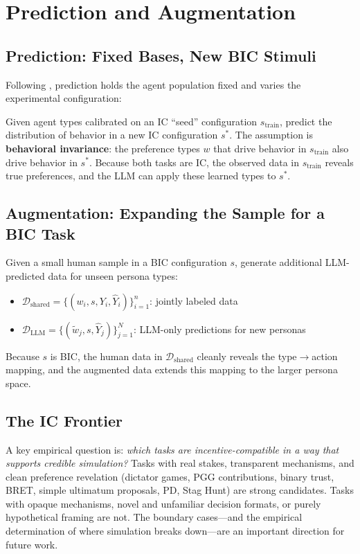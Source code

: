 \documentclass[12pt]{article}
\begin{document}
\section{Prediction and Augmentation}
\label{sec:pred_aug}

\subsection{Prediction: Fixed Bases, New BIC Stimuli}

Following \citet{manning2026general}, prediction holds the agent population fixed and varies the experimental configuration:

Given agent types calibrated on an IC ``seed'' configuration $s_{\text{train}}$, predict the distribution of behavior in a new IC configuration $s^*$. The assumption is \textbf{behavioral invariance}: the preference types $w$ that drive behavior in $s_{\text{train}}$ also drive behavior in $s^*$. Because both tasks are IC, the observed data in $s_{\text{train}}$ reveals true preferences, and the LLM can apply these learned types to $s^*$.

\subsection{Augmentation: Expanding the Sample for a BIC Task}

Given a small human sample in a BIC configuration $s$, generate additional LLM-predicted data for unseen persona types:
\begin{itemize}
  \item $\mathcal{D}_{\text{shared}} = \{(w_i, s, Y_i, \hat{Y}_i)\}_{i=1}^n$: jointly labeled data
  \item $\mathcal{D}_{\text{LLM}} = \{(\tilde{w}_j, s, \hat{Y}_j)\}_{j=1}^N$: LLM-only predictions for new personas
\end{itemize}
Because $s$ is BIC, the human data in $\mathcal{D}_{\text{shared}}$ cleanly reveals the type$\to$action mapping, and the augmented data extends this mapping to the larger persona space.

\subsection{The IC Frontier}

A key empirical question is: \textit{which tasks are incentive-compatible in a way that supports credible simulation?} Tasks with real stakes, transparent mechanisms, and clean preference revelation (dictator games, PGG contributions, binary trust, BRET, simple ultimatum proposals, PD, Stag Hunt) are strong candidates. Tasks with opaque mechanisms, novel and unfamiliar decision formats, or purely hypothetical framing are not. The boundary cases---and the empirical determination of where simulation breaks down---are an important direction for future work.
\end{document}
